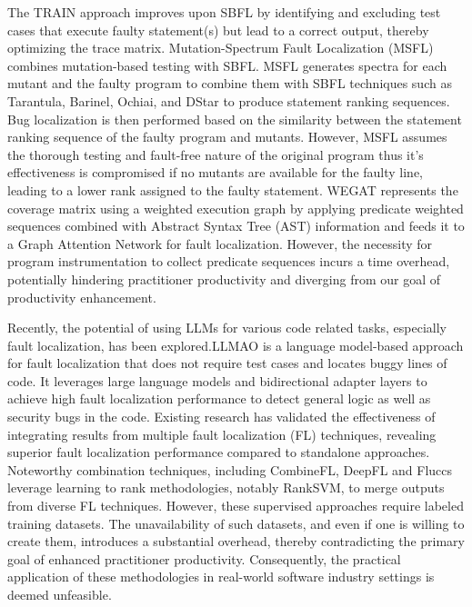 \documentclass[10pt,conference]{IEEEtran}
\begin{document}
	The TRAIN \cite{HU2024111900} approach improves upon SBFL by identifying and excluding test cases that execute faulty statement(s) but lead to a correct output, thereby optimizing the trace matrix. Mutation-Spectrum Fault Localization \cite{dutta2021msfl} (MSFL) \cite{dutta2021msfl} combines mutation-based testing with SBFL. MSFL generates spectra for each mutant and the faulty program to combine them with SBFL techniques such as Tarantula, Barinel, Ochiai, and DStar to produce statement ranking sequences. Bug localization is then performed based on the similarity between the statement ranking sequence of the faulty program and mutants. However, MSFL assumes the thorough testing and fault-free nature of the original program thus it's effectiveness is compromised if no mutants are available for the faulty line, leading to a lower rank assigned to the faulty statement. WEGAT \cite{yanimproving}  represents the coverage matrix using a weighted execution graph by applying predicate weighted sequences combined with Abstract Syntax Tree (AST) information and feeds it to a Graph Attention Network for fault localization. However, the necessity for program instrumentation to collect predicate sequences incurs a time overhead, potentially hindering practitioner productivity and diverging from our goal of productivity enhancement.
	
	Recently, the potential of using LLMs for various code related tasks, especially fault localization, has been explored.LLMAO \cite{yang2024large} is a language model-based approach for fault localization that does not require test cases and locates buggy lines of code. It leverages large language models and bidirectional adapter layers to achieve high fault localization performance to detect general logic as well as security bugs in the code.
	Existing research has validated the effectiveness of integrating results from multiple fault localization (FL) techniques, revealing superior fault localization performance compared to standalone approaches. Noteworthy combination techniques, including CombineFL\cite{zou2019empirical}, DeepFL\cite{li2019deepfl} and Fluccs\cite{sohn2017fluccs} leverage learning to rank methodologies, notably RankSVM, to merge outputs from diverse FL techniques. However, these supervised approaches require labeled training datasets. The unavailability of such datasets, and even if one is willing to create them, introduces a substantial overhead, thereby contradicting the primary goal of enhanced practitioner productivity. Consequently, the practical application of these methodologies in real-world software industry settings is deemed unfeasible.
	
\end{document}
